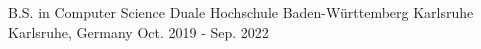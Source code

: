 

\begin{cventries}

  \cventry
    {B.S. in Computer Science} %
    {Duale Hochschule Baden-Württemberg Karlsruhe} %
    {Karlsruhe, Germany} %
    {Oct. 2019 - Sep. 2022} %
    {
      \begin{cvitems} %
      \end{cvitems}
    }

\end{cventries}
